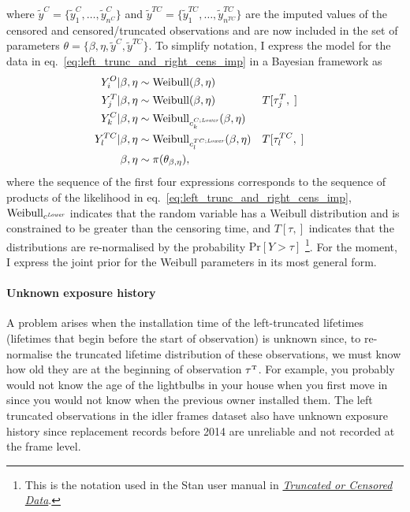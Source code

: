 where $\tilde{y}^C = \{\tilde{y}^C_1, \dots, \tilde{y}^C_{n^C}\}$ and $\tilde{y}^{TC} = \{\tilde{y}^{TC}_1, \dots, \tilde{y}^{TC}_{n^{TC}}\}$ are the imputed values of the censored and censored/truncated observations and are now included in the set of parameters $\theta = \{\beta, \eta, \tilde{y}^C, \tilde{y}^{TC}\}$. To simplify notation, I express the model for the data in eq.~\eqref{eq:left_trunc_and_right_cens_imp} in a Bayesian framework as
\begin{align*}
    Y^O_i|\beta, \eta    & \sim \hbox{Weibull}(\beta, \eta) \\
    Y^T_j|\beta, \eta    & \sim \hbox{Weibull}(\beta, \eta) && T[\tau^T_j, \;]\\
    Y^C_k|\beta, \eta    & \sim \hbox{Weibull}_{c^{C;\textit{\tiny{Lower}}}_k}(\beta, \eta) \\
    Y^{TC}_l|\beta, \eta & \sim \hbox{Weibull}_{c^{TC;\textit{\tiny{Lower}}}_l}(\beta, \eta) && T[\tau^{TC}_l, \;] \\
    \beta, \eta & \sim \pi(\theta_{\beta, \eta}),
\end{align*}
where the sequence of the first four expressions corresponds to the sequence of products of the likelihood in eq.~\eqref{eq:left_trunc_and_right_cens_imp}, $\hbox{Weibull}_{c^{\textit{\tiny{Lower}}}}$ indicates that the random variable has a Weibull distribution and is constrained to be greater than the censoring time, and $T[\tau, ]$ indicates that the distributions are re-normalised by the probability $\text{Pr}\left[Y > \tau\right]$ \citep{Stan2022} \footnote{This is the notation used in the Stan user manual in \href{https://mc-stan.org/docs/stan-users-guide/truncation-censoring.html}{\textit{Truncated or Censored Data}}.}. For the moment, I express the joint prior for the Weibull parameters in its most general form.

\paragraph{Unknown exposure history}

A problem arises when the installation time of the left-truncated lifetimes (lifetimes that begin before the start of observation) is unknown since, to re-normalise the truncated lifetime distribution of these observations, we must know how old they are at the beginning of observation $\tau^{\hbox{\tiny{T}}}$. For example, you probably would not know the age of the lightbulbs in your house when you first move in since you would not know when the previous owner installed them. The left truncated observations in the idler frames dataset also have unknown exposure history since replacement records before 2014 are unreliable and not recorded at the frame level.

